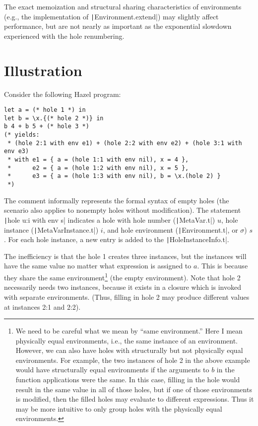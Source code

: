 \documentclass{article}
\begin{document}
The exact memoization and structural sharing characteristics of environments (e.g., the implementation of \texttt|Environment.extend|) may slightly affect performance, but are not nearly as important as the exponential slowdown experienced with the hole renumbering.

\section{Illustration}
Consider the following Hazel program:

\begin{verbatim}
let a = (* hole 1 *) in
let b = \x.{(* hole 2 *)} in
b 4 + b 5 + (* hole 3 *)
(* yields:
 * (hole 2:1 with env e1) + (hole 2:2 with env e2) + (hole 3:1 with env e3)
 * with e1 = { a = (hole 1:1 with env nil), x = 4 },
 *      e2 = { a = (hole 1:2 with env nil), x = 5 },
 *      e3 = { a = (hole 1:3 with env nil), b = \x.(hole 2) }
 *)
\end{verbatim}
The comment informally represents the formal syntax of empty holes (the scenario also applies to nonempty holes without modification). The statement \texttt|hole u:i with env s| indicates a hole with hole number (\texttt|MetaVar.t|) $u$, hole instance (\texttt|MetaVarInstance.t|) $i$, and hole environment (\texttt|Environment.t|, or $\sigma$) $s$. For each hole instance, a new entry is added to the \texttt|HoleInstanceInfo.t|.

The inefficiency is that the hole 1 creates three instances, but the instances will have the same value no matter what expression is assigned to $a$. This is because they share the same environment\footnote{We need to be careful what we mean by ``same environment.'' Here I mean physically equal environments, i.e., the same instance of an environment. However, we can also have holes with structurally but not physically equal environments. For example, the two instances of hole 2 in the above example would have structurally equal environments if the arguments to $b$ in the function applications were the same. In this case, filling in the hole would result in the same value in all of those holes, but if one of those environments is modified, then the filled holes may evaluate to different expressions. Thus it may be more intuitive to only group holes with the physically equal environments.} (the empty environment). Note that hole 2 necessarily needs two instances, because it exists in a closure which is invoked with separate environments. (Thus, filling in hole 2 may produce different values at instances 2:1 and 2:2).
\end{document}
